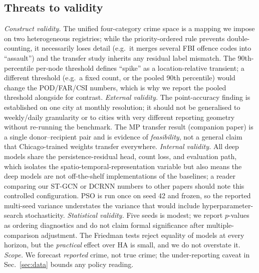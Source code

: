 \documentclass[11pt,conference]{IEEEtran}
\begin{document}
\subsection{Threats to validity}\label{sec:threats}
\textit{Construct validity.} The unified four-category crime space is a
mapping we impose on two heterogeneous registries; while the priority-ordered
rule prevents double-counting, it necessarily loses detail (e.g.\ it merges
several FBI offence codes into ``assault'') and the transfer study inherits
any residual label mismatch. The 90th-percentile per-node threshold defines
``spike'' as a location-relative transient; a different threshold (e.g.\ a
fixed count, or the pooled 90th percentile) would change the POD/FAR/CSI
numbers, which is why we report the pooled threshold alongside for contrast.
\textit{External validity.} The point-accuracy finding is established on one
city at monthly resolution; it should not be generalised to weekly/daily
granularity or to cities with very different reporting geometry without
re-running the benchmark. The MP transfer result (companion paper) is a single
donor--recipient pair and is evidence of \emph{feasibility}, not a general
claim that Chicago-trained weights transfer everywhere.
\textit{Internal validity.} All deep models share the persistence-residual
head, count loss, and evaluation path, which isolates the
spatio-temporal-representation variable but also means the deep models are
not off-the-shelf implementations of the baselines; a reader comparing our
ST-GCN or DCRNN numbers to other papers should note this controlled
configuration. PSO is run once on seed 42 and frozen, so the reported
multi-seed variance understates the variance that would include
hyperparameter-search stochasticity.
\textit{Statistical validity.} Five seeds is modest; we report $p$-values as
ordering diagnostics and do not claim formal significance after
multiple-comparison adjustment. The Friedman tests reject equality of models
at every horizon, but the \emph{practical} effect over HA is small, and we do
not overstate it.
\textit{Scope.} We forecast \emph{reported} crime, not true crime; the
under-reporting caveat in Sec.~\ref{sec:data} bounds any policy reading.

\end{document}
